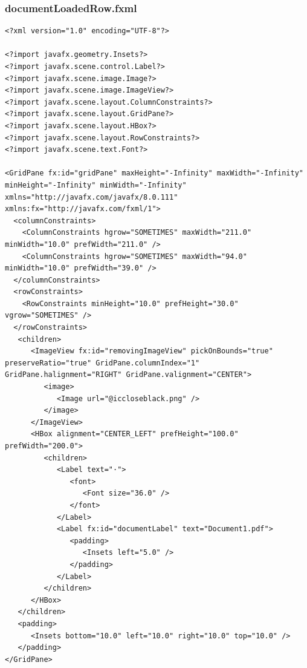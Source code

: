 \subsubsection{documentLoadedRow.fxml}
\begin{lstlisting}
<?xml version="1.0" encoding="UTF-8"?>

<?import javafx.geometry.Insets?>
<?import javafx.scene.control.Label?>
<?import javafx.scene.image.Image?>
<?import javafx.scene.image.ImageView?>
<?import javafx.scene.layout.ColumnConstraints?>
<?import javafx.scene.layout.GridPane?>
<?import javafx.scene.layout.HBox?>
<?import javafx.scene.layout.RowConstraints?>
<?import javafx.scene.text.Font?>

<GridPane fx:id="gridPane" maxHeight="-Infinity" maxWidth="-Infinity" minHeight="-Infinity" minWidth="-Infinity" xmlns="http://javafx.com/javafx/8.0.111" xmlns:fx="http://javafx.com/fxml/1">
  <columnConstraints>
    <ColumnConstraints hgrow="SOMETIMES" maxWidth="211.0" minWidth="10.0" prefWidth="211.0" />
    <ColumnConstraints hgrow="SOMETIMES" maxWidth="94.0" minWidth="10.0" prefWidth="39.0" />
  </columnConstraints>
  <rowConstraints>
    <RowConstraints minHeight="10.0" prefHeight="30.0" vgrow="SOMETIMES" />
  </rowConstraints>
   <children>
      <ImageView fx:id="removingImageView" pickOnBounds="true" preserveRatio="true" GridPane.columnIndex="1" GridPane.halignment="RIGHT" GridPane.valignment="CENTER">
         <image>
            <Image url="@iccloseblack.png" />
         </image>
      </ImageView>
      <HBox alignment="CENTER_LEFT" prefHeight="100.0" prefWidth="200.0">
         <children>
            <Label text="·">
               <font>
                  <Font size="36.0" />
               </font>
            </Label>
            <Label fx:id="documentLabel" text="Document1.pdf">
               <padding>
                  <Insets left="5.0" />
               </padding>
            </Label>
         </children>
      </HBox>
   </children>
   <padding>
      <Insets bottom="10.0" left="10.0" right="10.0" top="10.0" />
   </padding>
</GridPane>
\end{lstlisting}
